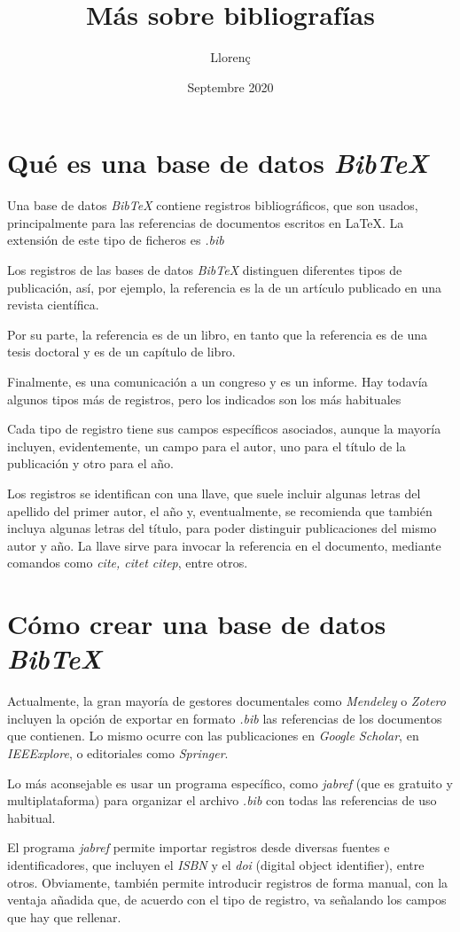 \documentclass{article}
\author{Llorenç}
\date{Septembre 2020}
\title {\Huge{Más sobre bibliografías}}
\begin{document}
\maketitle
\tableofcontents

\section{Qué es una base de datos {\em BibTeX}}

Una base de datos {\em BibTeX} contiene registros bibliográficos, que son usados, principalmente para las referencias de documentos escritos en \LaTeX{}. La extensión de este tipo de ficheros es {\em .bib}

Los registros de las bases de datos {\em BibTeX} distinguen diferentes tipos de publicación, así, por ejemplo, la referencia \cite{Valverde2008} es la de un artículo publicado en una revista científica.

Por su parte, la referencia \cite{Valverde2015} es de un libro, en tanto que la referencia \cite{MorenoNavarro2016} es de una tesis doctoral y \cite{BouchonMeunier1997} es de un capítulo de libro.

Finalmente, \cite{Almirall2010} es una comunicación a un congreso y \cite{Valverde1984} es un informe. Hay todavía algunos tipos más de registros, pero los indicados son los más habituales

Cada tipo de registro tiene sus campos específicos asociados, aunque la mayoría incluyen, evidentemente, un campo para el autor, uno para el título de la publicación y otro para el año.

Los registros se identifican con una llave, que suele incluir algunas letras del apellido del primer autor, el año y, eventualmente, se recomienda que también incluya algunas letras del título, para poder distinguir publicaciones del mismo autor y año. La llave sirve para invocar la referencia en el documento, mediante comandos como {\em cite, citet citep}, entre otros.

\section{Cómo crear una base de datos {\em BibTeX}}

Actualmente, la gran mayoría de gestores documentales como {\em Mendeley} o {\em Zotero} incluyen la opción de exportar en formato {\em .bib} las referencias de los documentos que contienen. Lo mismo ocurre con las publicaciones en {\em Google Scholar}, en {\em IEEExplore}, o editoriales como {\em Springer}. 

Lo más aconsejable es usar un programa específico, como {\em jabref} (que es gratuito y multiplataforma) para organizar el archivo {\em .bib} con todas las referencias de uso habitual.

El programa {\em jabref} permite importar registros desde diversas fuentes e identificadores, que incluyen el {\em ISBN} y el {\em doi} (digital object identifier), entre otros. Obviamente, también permite introducir registros de forma manual, con la ventaja añadida que, de acuerdo con el tipo de registro, va señalando los campos que hay que rellenar.



\end{document}
